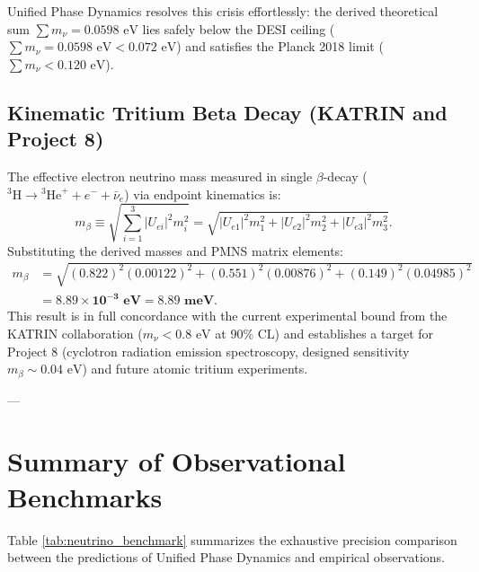 \documentclass[11pt,a4paper]{article}
\theoremstyle{definition}
\begin{document}
Unified Phase Dynamics resolves this crisis effortlessly: the derived theoretical sum $\sum m_\nu = 0.0598\text{ eV}$ lies safely below the DESI ceiling ($\sum m_\nu = 0.0598\text{ eV} < 0.072\text{ eV}$) and satisfies the Planck 2018 limit ($\sum m_\nu < 0.120\text{ eV}$).

\subsection{Kinematic Tritium Beta Decay (KATRIN and Project 8)}

The effective electron neutrino mass measured in single $\beta$-decay ($^3\mathrm{H} \to {}^3\mathrm{He}^+ + e^- + \bar{\nu}_e$) via endpoint kinematics is:
\begin{equation}
    m_\beta \equiv \sqrt{ \sum_{i=1}^3 |U_{ei}|^2 m_i^2 } = \sqrt{ |U_{e1}|^2 m_1^2 + |U_{e2}|^2 m_2^2 + |U_{e3}|^2 m_3^2 }.
\end{equation}
Substituting the derived masses and PMNS matrix elements:
\begin{align}
    m_\beta &= \sqrt{ (0.822)^2 (0.00122)^2 + (0.551)^2 (0.00876)^2 + (0.149)^2 (0.04985)^2 } \nonumber \\
    &= \mathbf{8.89 \times 10^{-3}\text{ eV}} = \mathbf{8.89\text{ meV}}.
\end{align}
This result is in full concordance with the current experimental bound from the KATRIN collaboration ($m_\nu < 0.8\text{ eV}$ at $90\%\text{ CL}$) \cite{KATRIN2022} and establishes a target for Project 8 (cyclotron radiation emission spectroscopy, designed sensitivity $m_\beta \sim 0.04\text{ eV}$) and future atomic tritium experiments.

---

\section{Summary of Observational Benchmarks}

Table \ref{tab:neutrino_benchmark} summarizes the exhaustive precision comparison between the predictions of Unified Phase Dynamics and empirical observations.
\end{document}
